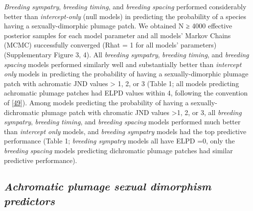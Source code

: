 \documentclass[
  a4paper,
]{article}
\begin{document}
\emph{Breeding sympatry}, \emph{breeding timing}, and \emph{breeding
spacing} performed considerably better than \emph{intercept-only} (null
models) in predicting the probability of a species having a
sexually-dimorphic plumage patch. We obtained N ≥ 4000 effective
posterior samples for each model parameter and all models' Markov Chains
(MCMC) successfully converged (Rhat = 1 for all models' parameters)
(Supplementary Figure 3, 4). All \emph{breeding sympatry},
\emph{breeding timing}, and \emph{breeding spacing} models performed
similarly well and substantially better than \emph{intercept only}
models in predicting the probability of having a sexually-dimorphic
plumage patch with achromatic JND values \textgreater{} 1, 2, or 3
(Table 1; all models predicting achromatic plumage patches had ELPD
values within 4, following the convention of
{[}\protect\hyperlink{ref-burnham2002}{49}{]}). Among models predicting
the probability of having a sexually-dichromatic plumage patch with
chromatic JND values \textgreater1, 2, or 3, all \emph{breeding
sympatry}, \emph{breeding timing}, and \emph{breeding spacing} models
performed much better than \emph{intercept only} models, and
\emph{breeding sympatry} models had the top predictive performance
(Table 1; \emph{breeding sympatry} models all have ELPD =0, only the
\emph{breeding spacing} models predicting dichromatic plumage patches
had similar predictive performance).

\hypertarget{achromatic-plumage-sexual-dimorphism-predictors}{%
\subsection{\texorpdfstring{\emph{Achromatic plumage sexual dimorphism
predictors}}{Achromatic plumage sexual dimorphism predictors}}\label{achromatic-plumage-sexual-dimorphism-predictors}}
\end{document}
